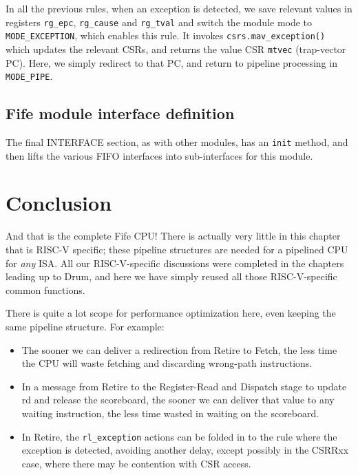 In all the previous rules, when an exception is detected, we save
relevant values in registers \verb|rg_epc|, \verb|rg_cause| and
\verb|rg_tval| and switch the module mode to \verb|MODE_EXCEPTION|,
which enables this rule.  It invokes \verb|csrs.mav_exception()| which
updates the relevant CSRs, and returns the value CSR \verb|mtvec|
(trap-vector PC).  Here, we simply redirect to that PC, and return to
pipeline processing in \verb|MODE_PIPE|.


\subsection{Fife module interface definition}

The final INTERFACE section, as with other modules, has an \verb|init|
method, and then lifts the various FIFO interfaces into sub-interfaces
for this module.




\section{Conclusion}

And that is the complete Fife CPU!  There is actually very little in
this chapter that is RISC-V specific; these pipeline structures are
needed for a pipelined CPU for \emph{any} ISA.  All our
RISC-V-specific discussions were completed in the chapters leading up
to Drum, and here we have simply reused all those RISC-V-specific
common functions.

There is quite a lot scope for performance optimization here, even
keeping the same pipeline structure.  For example:

\begin{itemize}

\item The sooner we can deliver a redirection from Retire to Fetch,
      the less time the CPU will waste fetching and discarding
      wrong-path instructions.

\item In a message from Retire to the Register-Read and Dispatch stage
      to update rd and release the scoreboard, the sooner we can
      deliver that value to any waiting instruction, the less time
      wasted in waiting on the scoreboard.

\item In Retire, the \verb|rl_exception| actions can be folded in to
      the rule where the exception is detected, avoiding another
      delay, except possibly in the CSRRxx case, where there may be
      contention with CSR access.

\end{itemize}

